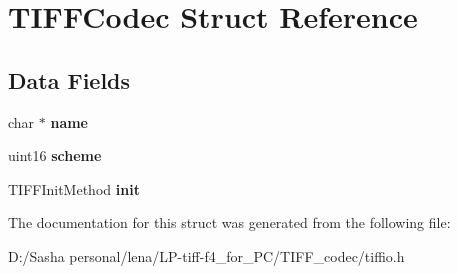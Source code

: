 \hypertarget{struct_t_i_f_f_codec}{}\section{T\+I\+F\+F\+Codec Struct Reference}
\label{struct_t_i_f_f_codec}
\subsection*{Data Fields}
\begin{DoxyCompactItemize}
\item 
\hypertarget{struct_t_i_f_f_codec_a5ac083a645d964373f022d03df4849c8}{}char $\ast$ {\bfseries name}\label{struct_t_i_f_f_codec_a5ac083a645d964373f022d03df4849c8}

\item 
\hypertarget{struct_t_i_f_f_codec_ad6d8c9eec30996725c818b48876b8867}{}uint16 {\bfseries scheme}\label{struct_t_i_f_f_codec_ad6d8c9eec30996725c818b48876b8867}

\item 
\hypertarget{struct_t_i_f_f_codec_a11c2624490574580b6c1523c92d80ca6}{}T\+I\+F\+F\+Init\+Method {\bfseries init}\label{struct_t_i_f_f_codec_a11c2624490574580b6c1523c92d80ca6}

\end{DoxyCompactItemize}


The documentation for this struct was generated from the following file\+:\begin{DoxyCompactItemize}
\item 
D\+:/\+Sasha personal/lena/\+L\+P-\/tiff-\/f4\+\_\+for\+\_\+\+P\+C/\+T\+I\+F\+F\+\_\+codec/tiffio.\+h\end{DoxyCompactItemize}

